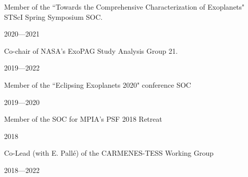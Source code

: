 \documentclass[12pt, a4paper]{article} %
\begin{document}
\vspace{0.2cm}

\begin{minipage}[t]{0.7\textwidth}
\begin{flushleft}%
  \setlength{\leftskip}{0.2cm}%
Member of the ``Towards the Comprehensive Characterization of Exoplanets" STScI Spring Symposium SOC.
\end{flushleft}
\end{minipage}
\begin{minipage}[t]{0.3\textwidth}
\hfill 2020---2021
\end{minipage}

\vspace{0.2cm}

\begin{minipage}[t]{0.7\textwidth}
\begin{flushleft}%
  \setlength{\leftskip}{0.2cm}%
Co-chair of NASA's ExoPAG Study Analysis Group 21.
\end{flushleft}
\end{minipage}
\begin{minipage}[t]{0.3\textwidth}
\hfill 2019---2022
\end{minipage}

\vspace{0.2cm}

\begin{minipage}[t]{0.7\textwidth}
\begin{flushleft}%
  \setlength{\leftskip}{0.2cm}%
Member of the ``Eclipsing Exoplanets 2020" conference SOC
\end{flushleft}
\end{minipage}
\begin{minipage}[t]{0.3\textwidth}
\hfill 2019---2020
\end{minipage}

\vspace{0.2cm}

\begin{minipage}[t]{0.7\textwidth}
\begin{flushleft}%
  \setlength{\leftskip}{0.2cm}%
Member of the SOC for MPIA's PSF 2018 Retreat 
\end{flushleft}
\end{minipage}
\begin{minipage}[t]{0.3\textwidth}
\hfill 2018
\end{minipage}

\vspace{0.2cm}

\begin{minipage}[t]{0.7\textwidth}
\begin{flushleft}%
  \setlength{\leftskip}{0.2cm}%
Co-Lead (with E. Pall\'e) of the CARMENES-TESS Working Group 
\end{flushleft}
\end{minipage}
\begin{minipage}[t]{0.3\textwidth}
\hfill 2018---2022
\end{minipage}
\end{document}
